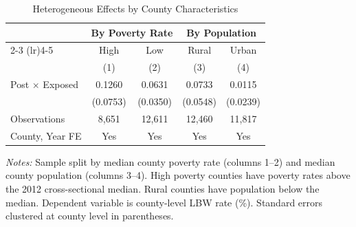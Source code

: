 \begin{table}[t]
\centering
\caption{Heterogeneous Effects by County Characteristics}
\label{tab:hetero}
\begin{tabular}{lcccc}
\toprule
 & \multicolumn{2}{c}{By Poverty Rate} & \multicolumn{2}{c}{By Population} \\
\cmidrule(lr){2-3} \cmidrule(lr){4-5}
 & High & Low & Rural & Urban \\
 & (1) & (2) & (3) & (4) \\
\midrule
Post $\times$ Exposed & 0.1260 & 0.0631 & 0.0733 & 0.0115 \\
 & (0.0753) & (0.0350) & (0.0548) & (0.0239) \\
\midrule
Observations & 8,651 & 12,611 & 12,460 & 11,817 \\
County, Year FE & Yes & Yes & Yes & Yes \\
\bottomrule
\end{tabular}
\begin{tablenotes}
\item \textit{Notes:} Sample split by median county poverty rate (columns 1--2) and median county population (columns 3--4). High poverty counties have poverty rates above the 2012 cross-sectional median. Rural counties have population below the median. Dependent variable is county-level LBW rate (\%). Standard errors clustered at county level in parentheses.
\end{tablenotes}
\end{table}

